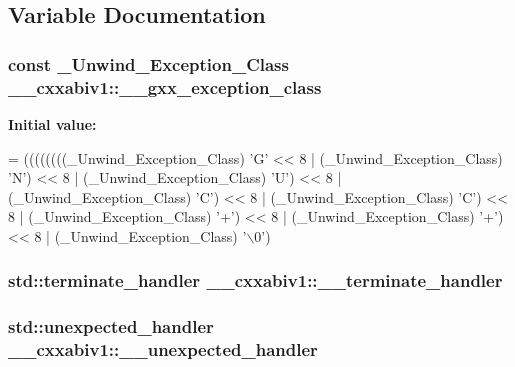 \subsection{Variable Documentation}
\hypertarget{namespace____cxxabiv1_a80b0f73d26cf8434d330a3a578862519}{
\subsubsection[{\-\_\-\-\_\-gxx\-\_\-exception\-\_\-class}]{\setlength{\rightskip}{0pt plus 5cm}const \-\_\-\-Unwind\-\_\-\-Exception\-\_\-\-Class \-\_\-\-\_\-cxxabiv1\-::\-\_\-\-\_\-gxx\-\_\-exception\-\_\-class}}\label{namespace____cxxabiv1_a80b0f73d26cf8434d330a3a578862519}
{\bfseries Initial value\-:}
\begin{DoxyCode}
= ((((((((\_Unwind\_Exception\_Class) \textcolor{charliteral}{'G'} 
     << 8 | (\_Unwind\_Exception\_Class) \textcolor{charliteral}{'N'})
    << 8 | (\_Unwind\_Exception\_Class) \textcolor{charliteral}{'U'})
       << 8 | (\_Unwind\_Exception\_Class) \textcolor{charliteral}{'C'})
      << 8 | (\_Unwind\_Exception\_Class) \textcolor{charliteral}{'C'})
     << 8 | (\_Unwind\_Exception\_Class) \textcolor{charliteral}{'+'})
    << 8 | (\_Unwind\_Exception\_Class) \textcolor{charliteral}{'+'})
   << 8 | (\_Unwind\_Exception\_Class) \textcolor{charliteral}{'\(\backslash\)0'})
\end{DoxyCode}
\hypertarget{namespace____cxxabiv1_a0128b535d39d6d6df146d8675585a634}{
\subsubsection[{\-\_\-\-\_\-terminate\-\_\-handler}]{\setlength{\rightskip}{0pt plus 5cm}std\-::terminate\-\_\-handler \-\_\-\-\_\-cxxabiv1\-::\-\_\-\-\_\-terminate\-\_\-handler}}\label{namespace____cxxabiv1_a0128b535d39d6d6df146d8675585a634}
\hypertarget{namespace____cxxabiv1_a47e07d381357c2eb2b92436d7ff86f4b}{
\subsubsection[{\-\_\-\-\_\-unexpected\-\_\-handler}]{\setlength{\rightskip}{0pt plus 5cm}std\-::unexpected\-\_\-handler \-\_\-\-\_\-cxxabiv1\-::\-\_\-\-\_\-unexpected\-\_\-handler}}\label{namespace____cxxabiv1_a47e07d381357c2eb2b92436d7ff86f4b}
